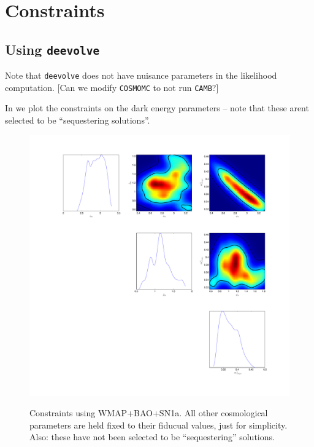\documentclass[amsmath,amssymb,12pt,eqsecnum]{revtex4}
\newcommand{\comment}[1]{{\color{red}[#1]}}
\begin{document}
\section{Constraints}
\subsection{Using {\tt deevolve}}
Note that {\tt deevolve} does not have nuisance parameters in the likelihood computation. \comment{Can we modify {\tt COSMOMC} to not run {\tt CAMB}?}

In  we plot the constraints on the dark energy parameters -- note that these arent selected to be ``sequestering solutions''.
\begin{figure}[!t]
      \begin{center}
{\includegraphics[scale=0.4]{images/tri_run_10000.pdf}}
      \end{center}
\caption{Constraints using WMAP+BAO+SN1a. All other cosmological parameters are held fixed to their fiducual values, just for simplicity. Also: these have not been selected to be ``sequestering'' solutions. }\label{fig:const_fixed_cosm_deevolve}
\end{figure}
\end{document}
